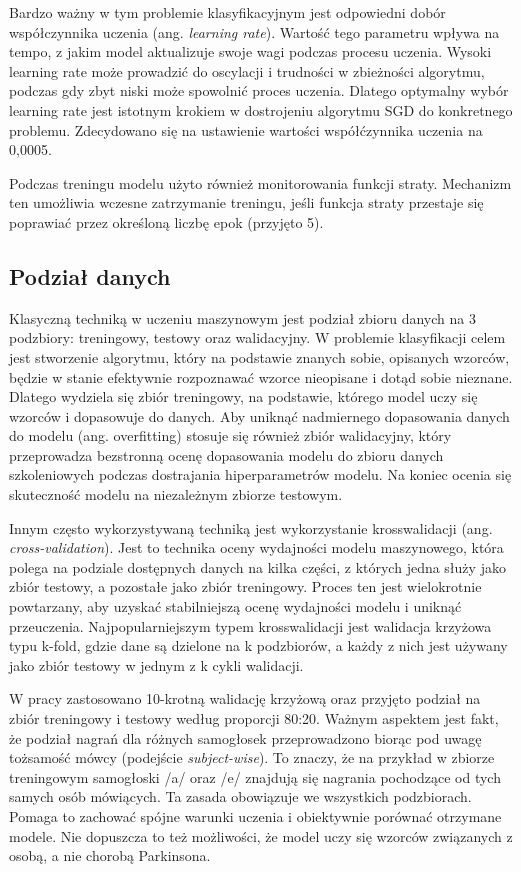 Bardzo ważny w tym problemie klasyfikacyjnym jest odpowiedni dobór współczynnika uczenia (ang. \emph{learning rate}).
Wartość tego parametru wpływa na tempo, z jakim model aktualizuje swoje wagi podczas procesu uczenia.
Wysoki learning rate może prowadzić do oscylacji i trudności w zbieżności algorytmu, podczas gdy zbyt niski może spowolnić proces uczenia.
Dlatego optymalny wybór learning rate jest istotnym krokiem w dostrojeniu algorytmu SGD do konkretnego problemu.
Zdecydowano się na ustawienie wartości współćzynnika uczenia na 0,0005.

Podczas treningu modelu użyto również monitorowania funkcji straty.
Mechanizm ten umożliwia wczesne zatrzymanie treningu, jeśli funkcja straty przestaje się poprawiać przez określoną liczbę epok (przyjęto 5).

\subsection{Podział danych}
\label{subsec:podzial-danych}

Klasyczną techniką w uczeniu maszynowym jest podział zbioru danych na 3 podzbiory: treningowy, testowy oraz walidacyjny.
W problemie klasyfikacji celem jest stworzenie algorytmu, który na podstawie znanych sobie, opisanych wzorców, będzie w stanie efektywnie rozpoznawać wzorce nieopisane i dotąd sobie nieznane.
Dlatego wydziela się zbiór treningowy, na podstawie, którego model uczy się wzorców i dopasowuje do danych.
Aby uniknąć nadmiernego dopasowania danych do modelu (ang.
overfitting) stosuje się również zbiór walidacyjny, który  przeprowadza bezstronną ocenę dopasowania modelu do zbioru danych szkoleniowych podczas dostrajania hiperparametrów modelu.
Na koniec ocenia się skuteczność modelu na niezależnym zbiorze testowym.

Innym często wykorzystywaną techniką jest wykorzystanie krosswalidacji (ang. \emph{cross-validation}).
Jest to technika oceny wydajności modelu maszynowego, która polega na podziale dostępnych danych na kilka części, z których jedna służy jako zbiór testowy, a pozostałe jako zbiór treningowy.
Proces ten jest wielokrotnie powtarzany, aby uzyskać stabilniejszą ocenę wydajności modelu i uniknąć przeuczenia.
Najpopularniejszym typem krosswalidacji jest walidacja krzyżowa typu k-fold, gdzie dane są dzielone na k podzbiorów, a każdy z nich jest używany jako zbiór testowy w jednym z k cykli walidacji.

W pracy zastosowano 10-krotną walidację krzyżową oraz przyjęto podział na zbiór treningowy i testowy według proporcji 80:20.
Ważnym aspektem jest fakt, że podział nagrań dla różnych samogłosek przeprowadzono biorąc pod uwagę tożsamość mówcy (podejście \emph{subject-wise}).
To znaczy, że na przykład w zbiorze treningowym samogłoski /a/ oraz /e/ znajdują się nagrania pochodzące od tych samych osób mówiących.
Ta zasada obowiązuje we wszystkich podzbiorach.
Pomaga to zachować spójne warunki uczenia i obiektywnie porównać otrzymane modele.
Nie dopuszcza to też możliwości, że model uczy się wzorców związanych z osobą, a nie chorobą Parkinsona.

